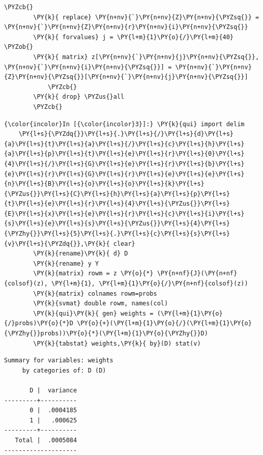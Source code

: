 \documentclass[11pt,notitlepage]{article}\usepackage[]{graphicx}\usepackage[]{color}
\makeatletter
\newenvironment{kframe}{%
 \def\at@end@of@kframe{}%
 \ifinner\ifhmode%
  \def\at@end@of@kframe{\end{minipage}}%
  \begin{minipage}{\columnwidth}%
 \fi\fi%
 \def\FrameCommand##1{\hskip\@totalleftmargin \hskip-\fboxsep
 \colorbox{shadecolor}{##1}\hskip-\fboxsep
     \hskip-\linewidth \hskip-\@totalleftmargin \hskip\columnwidth}%
 \MakeFramed {\advance\hsize-\width
   \@totalleftmargin\z@ \linewidth\hsize
   \@setminipage}}%
 {\par\unskip\endMakeFramed%
 \at@end@of@kframe}
\newenvironment{knitrout}{}{} %
\makeatother
\begin{document}
\begin{enumerate}[a)]
\begin{knitrout}
\begin{kframe}
\begin{Verbatim}[commandchars=\\\{\}]
        	\PYZcb{}
        \PY{k}{	replace} \PY{n+nv}{`}\PY{n+nv}{Z}\PY{n+nv}{\PYZsq{}} = \PY{n+nv}{`}\PY{n+nv}{Z}\PY{n+nv}{r}\PY{n+nv}{i}\PY{n+nv}{\PYZsq{}}
        \PY{k}{	forvalues} j = \PY{l+m}{1}\PY{o}{/}\PY{l+m}{40} \PYZob{}
        \PY{k}{	matrix} z[\PY{n+nv}{`}\PY{n+nv}{j}\PY{n+nv}{\PYZsq{}}, \PY{n+nv}{`}\PY{n+nv}{i}\PY{n+nv}{\PYZsq{}}] = \PY{n+nv}{`}\PY{n+nv}{Z}\PY{n+nv}{\PYZsq{}}[\PY{n+nv}{`}\PY{n+nv}{j}\PY{n+nv}{\PYZsq{}}]
        	\PYZcb{}
        \PY{k}{	drop} \PYZus{}all
        \PYZcb{}
\end{Verbatim}

    \begin{Verbatim}[commandchars=\\\{\}]
{\color{incolor}In [{\color{incolor}3}]:} \PY{k}{qui} import delim 
	\PY{l+s}{\PYZdq{}}\PY{l+s}{.}\PY{l+s}{/}\PY{l+s}{d}\PY{l+s}{a}\PY{l+s}{t}\PY{l+s}{a}\PY{l+s}{/}\PY{l+s}{c}\PY{l+s}{h}\PY{l+s}{a}\PY{l+s}{p}\PY{l+s}{t}\PY{l+s}{e}\PY{l+s}{r}\PY{l+s}{0}\PY{l+s}{4}\PY{l+s}{/}\PY{l+s}{G}\PY{l+s}{e}\PY{l+s}{r}\PY{l+s}{b}\PY{l+s}{e}\PY{l+s}{r}\PY{l+s}{G}\PY{l+s}{r}\PY{l+s}{e}\PY{l+s}{e}\PY{l+s}{n}\PY{l+s}{B}\PY{l+s}{o}\PY{l+s}{o}\PY{l+s}{k}\PY{l+s}{\PYZus{}}\PY{l+s}{C}\PY{l+s}{h}\PY{l+s}{a}\PY{l+s}{p}\PY{l+s}{t}\PY{l+s}{e}\PY{l+s}{r}\PY{l+s}{4}\PY{l+s}{\PYZus{}}\PY{l+s}{E}\PY{l+s}{x}\PY{l+s}{e}\PY{l+s}{r}\PY{l+s}{c}\PY{l+s}{i}\PY{l+s}{s}\PY{l+s}{e}\PY{l+s}{s}\PY{l+s}{\PYZus{}}\PY{l+s}{4}\PY{l+s}{\PYZhy{}}\PY{l+s}{5}\PY{l+s}{.}\PY{l+s}{c}\PY{l+s}{s}\PY{l+s}{v}\PY{l+s}{\PYZdq{}},\PY{k}{ clear}
        \PY{k}{rename}\PY{k}{ d} D
        \PY{k}{rename} y Y
        \PY{k}{matrix} rowm = z \PY{o}{*} \PY{n+nf}{J}(\PY{n+nf}{colsof}(z), \PY{l+m}{1}, \PY{l+m}{1}\PY{o}{/}\PY{n+nf}{colsof}(z))
        \PY{k}{matrix} colnames rowm=probs
        \PY{k}{svmat} double rowm, names(col)       
        \PY{k}{qui}\PY{k}{ gen} weights = (\PY{l+m}{1}\PY{o}{/}probs)\PY{o}{*}D \PY{o}{+}(\PY{l+m}{1}\PY{o}{/}(\PY{l+m}{1}\PY{o}{\PYZhy{}}probs))\PY{o}{*}(\PY{l+m}{1}\PY{o}{\PYZhy{}}D)        
        \PY{k}{tabstat} weights,\PY{k}{ by}(D) stat(v)
\end{Verbatim}

    \begin{Verbatim}[commandchars=\\\{\}]
Summary for variables: weights
     by categories of: D (D)

       D |  variance
---------+----------
       0 |  .0004185
       1 |   .000625
---------+----------
   Total |  .0005084
--------------------

    \end{Verbatim}
\end{kframe}
\end{knitrout}


\end{enumerate}
\end{document}
